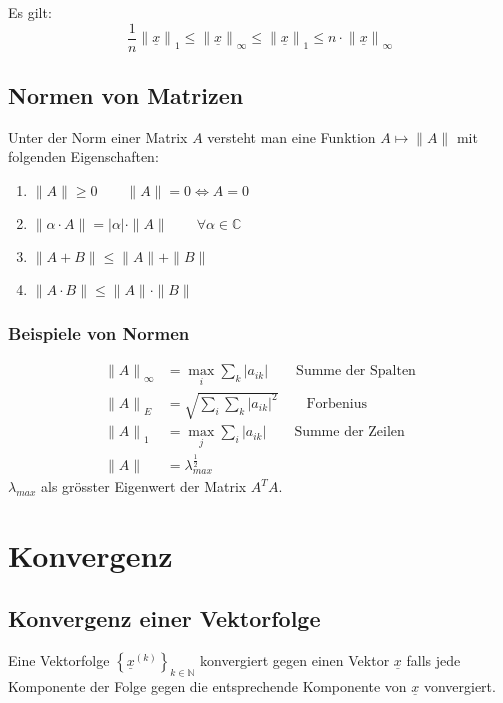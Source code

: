 Es gilt:
\begin{equation}
  \frac{1}{n}{\|\underline{x}\|}_1 \leq {\|\underline{x}\|}_\infty \leq {\|\underline{x}\|}_1 \leq n\cdot {\|\underline{x}\|}_\infty
\end{equation}

\subsection{Normen von Matrizen}
Unter der Norm einer Matrix $A$ versteht man eine Funktion $A\longmapsto\|A\|$ mit folgenden Eigenschaften:
\begin{enumerate}
  \item $\|A\|\geq 0 \qquad\|A\|=0 \Leftrightarrow A=0$
  \item $\|\alpha \cdot A\| = |\alpha |\cdot\|A\|\qquad\forall\alpha\in\mathbb{C}$
  \item $\|A+B\|\leq\|A\|+\|B\|$
  \item $\|A\cdot B\|\leq\|A\|\cdot\|B\|$
\end{enumerate}

\subsubsection{Beispiele von Normen}
\begin{align}
  {\|A\|}_\infty &= \max_{i}\sum_k |a_{ik}| \qquad\text{Summe der Spalten}\\
  {\|A\|}_E &= \sqrt{\sum_i \sum_k {|a_{ik}|}^2} \qquad\text{Forbenius} \\
  {\|A\|}_1 &= \max_j \sum_i |a_{ik}| \qquad\text{Summe der Zeilen} \\
  {\|A\|} &= \lambda_{max}^{\frac{1}{2}}
\end{align}
$\lambda_{max}$ als gr\"osster Eigenwert der Matrix $A^TA$.

\section{Konvergenz}

\subsection{Konvergenz einer Vektorfolge}
Eine Vektorfolge ${\left\{\underline{x}^{(k)}\right\}}_{k \in \mathbb{N}}$ konvergiert gegen einen Vektor $\underline{x}$ falls jede Komponente der Folge gegen die entsprechende Komponente von $\underline{x}$ vonvergiert.

